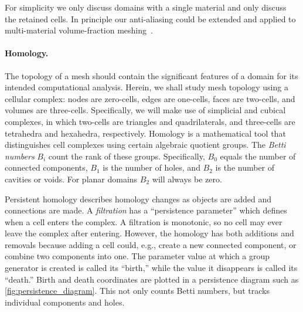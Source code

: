 For simplicity we only discuss domains with a single material and only discuss the retained cells.
In principle our anti-aliasing could be extended and applied to multi-material volume-fraction 
meshing~\cite{ZHANG2010405,owen2017hexahedral}.




\paragraph{Homology.}
The topology of a mesh should contain the significant features of a domain for its intended computational analysis.
Herein, we shall study mesh topology using a cellular complex: nodes are zero-cells, edges are one-cells, faces are two-cells, and volumes are three-cells. 
Specifically, we will make use of simplicial and cubical complexes, in which two-cells are triangles and quadrilaterals, and three-cells are tetrahedra and hexahedra, respectively.
Homology \cite{Hatcher:2001} is a mathematical tool that distinguishes cell complexes using certain algebraic quotient groups. 
The \emph{Betti numbers} $B_{i}$ count the rank of these groups.
Specifically, $B_{0}$ equals the number of connected components, $B_{1}$ is the number of holes, and $B_2$ is the number of cavities or voids.
For planar domains $B_2$ will always be zero.

Persistent homology \cite{Edelsbrunner:2002,Otter:2017} describes homology changes as objects are added and connections are made.
A \emph{filtration} has a ``persistence parameter'' which defines when a cell enters the complex. 
A filtration is monotonic, so no cell may ever leave the complex after entering. 
However, the homology has both additions and removals because adding a cell could, e.g., create a new connected component, or combine two components into one. 
The parameter value at which a group generator is created is called its ``birth,'' while the value it disappears is called its ``death.''
Birth and death coordinates are plotted in a persistence diagram such as \cref{fig:persistence_diagram}.
This not only counts Betti numbers, but tracks individual components and holes.


